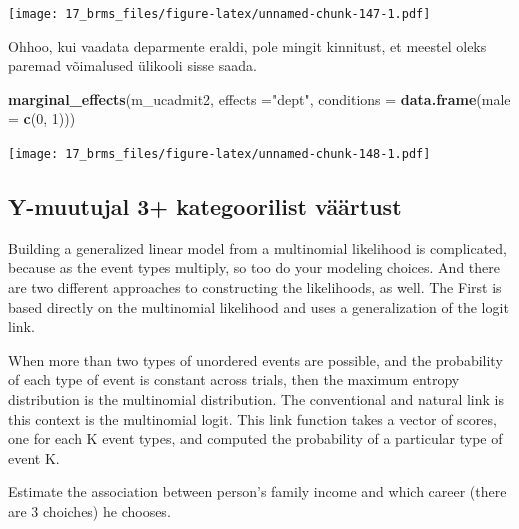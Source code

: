 \documentclass[]{book}
\newenvironment{Shaded}{\begin{snugshade}}{\end{snugshade}}
\newcommand{\KeywordTok}[1]{\textcolor[rgb]{0.13,0.29,0.53}{\textbf{#1}}}
\newcommand{\DataTypeTok}[1]{\textcolor[rgb]{0.13,0.29,0.53}{#1}}
\newcommand{\DecValTok}[1]{\textcolor[rgb]{0.00,0.00,0.81}{#1}}
\newcommand{\StringTok}[1]{\textcolor[rgb]{0.31,0.60,0.02}{#1}}
\newcommand{\NormalTok}[1]{#1}
\begin{document}
\texttt{[image: 17\_brms\_files/figure-latex/unnamed-chunk-147-1.pdf]}

Ohhoo, kui vaadata deparmente eraldi, pole mingit kinnitust, et meestel
oleks paremad võimalused ülikooli sisse saada.

\begin{Shaded}
\begin{Highlighting}[]
\KeywordTok{marginal_effects}\NormalTok{(m_ucadmit2, }\DataTypeTok{effects =}\StringTok{"dept"}\NormalTok{, }\DataTypeTok{conditions =} \KeywordTok{data.frame}\NormalTok{(}\DataTypeTok{male =} \KeywordTok{c}\NormalTok{(}\DecValTok{0}\NormalTok{, }\DecValTok{1}\NormalTok{)))}
\end{Highlighting}
\end{Shaded}

\texttt{[image: 17\_brms\_files/figure-latex/unnamed-chunk-148-1.pdf]}

\subsection{Y-muutujal 3+ kategoorilist
väärtust}\label{y-muutujal-3-kategoorilist-vaartust}

Building a generalized linear model from a multinomial likelihood is
complicated, because as the event types multiply, so too do your
modeling choices. And there are two different approaches to constructing
the likelihoods, as well. The First is based directly on the multinomial
likelihood and uses a generalization of the logit link.

When more than two types of unordered events are possible, and the
probability of each type of event is constant across trials, then the
maximum entropy distribution is the multinomial distribution. The
conventional and natural link is this context is the multinomial logit.
This link function takes a vector of scores, one for each K event types,
and computed the probability of a particular type of event K.

Estimate the association between person's family income and which career
(there are 3 choiches) he chooses.
\end{document}
